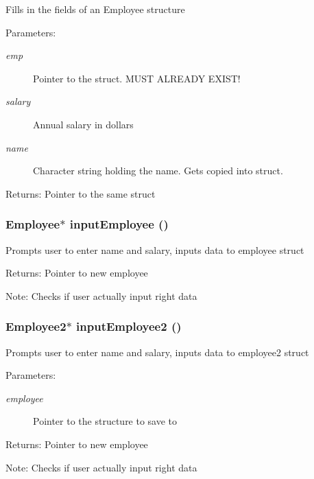 Fills in the fields of an Employee structure \begin{Desc}
\item[Parameters:]
\begin{description}
\item[{\em emp}]Pointer to the struct. MUST ALREADY EXIST! \item[{\em salary}]Annual salary in dollars \item[{\em name}]Character string holding the name. Gets copied into struct. \end{description}
\end{Desc}
\begin{Desc}
\item[Returns:]Pointer to the same struct \end{Desc}
\subsubsection{\setlength{\rightskip}{0pt plus 5cm}\bf{Employee}$\ast$ input\-Employee ()}\label{employee_8c_df7bcba34669423d7f8bdd8c8122ecd3}


Prompts user to enter name and salary, inputs data to employee struct \begin{Desc}
\item[Returns:]Pointer to new employee \end{Desc}
\begin{Desc}
\item[Note:]Checks if user actually input right data \end{Desc}
\subsubsection{\setlength{\rightskip}{0pt plus 5cm}\bf{Employee2}$\ast$ input\-Employee2 ()}\label{employee_8c_4bbd1151cc7051aa5bf412b4b7a75c85}


Prompts user to enter name and salary, inputs data to employee2 struct \begin{Desc}
\item[Parameters:]
\begin{description}
\item[{\em employee}]Pointer to the structure to save to \end{description}
\end{Desc}
\begin{Desc}
\item[Returns:]Pointer to new employee \end{Desc}
\begin{Desc}
\item[Note:]Checks if user actually input right data \end{Desc}
